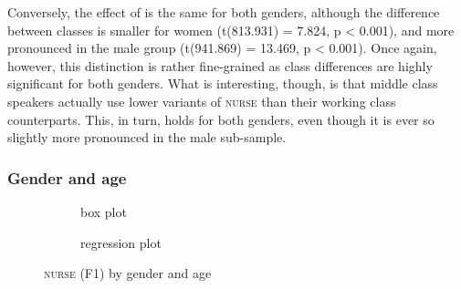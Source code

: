 Conversely, the effect of  is the same for both genders, although the difference between classes is smaller for women (t(813.931) = 7.824, p < 0.001), and more pronounced in the male group (t(941.869) = 13.469, p < 0.001).
Once again, however, this distinction is rather fine-grained as class differences are highly significant for both genders.
What is interesting, though, is that middle class speakers actually use lower variants of \textsc{nurse} than their working class counterparts.
This, in turn, holds for both genders, even though it is ever so slightly more pronounced in the male sub-sample.

\subsubsection{Gender and age}
\label{sec.prod.res.vow.nurse.f1.genderage}

\begin{figure}[h!]
	\centering
	\begin{subfigure}{.49\textwidth}
		\centering
			\resizebox{\linewidth}{!}{} 
		\caption{box plot}
		\label{fig.box.f1w.nurse.genderage}
	\end{subfigure}
	\begin{subfigure}{.49\textwidth}
		\centering
			\resizebox{\linewidth}{!}{} 
		\caption{regression plot}
		\label{fig.scatter.f1w.nurse.genderage}
	\end{subfigure}
	\caption{\textsc{nurse} (F1) by gender and age}
\end{figure}

